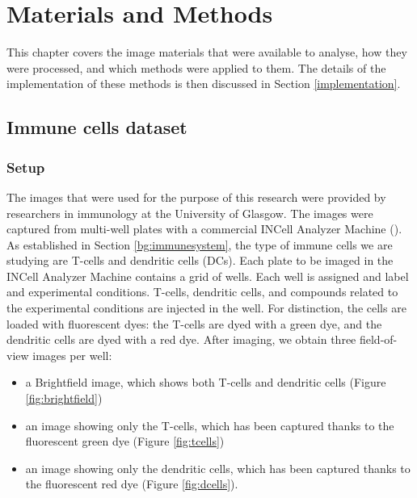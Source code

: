 \documentclass{l4proj}
\begin{document}
\chapter{Materials and Methods} \label{sec:mm}

This chapter covers the image materials that were available to analyse, how they were processed, and which methods were applied to them. The details of the implementation of these methods is then discussed in Section \ref{implementation}.

\section{Immune cells dataset}

\subsection{Setup}

The images that were used for the purpose of this research were provided by researchers in immunology at the University of Glasgow. The images were captured from multi-well plates with a commercial INCell Analyzer Machine (\cite{https://www.gelifesciences.com/en/us/shop/cell-imaging-and-analysis/high-content-analysis-systems/instruments/in-cell-analyzer-2500-hs-high-content-analysis-hca-imaging-system-p-04586}). As established in Section \ref{bg:immunesystem}, the type of immune cells we are studying are T-cells and dendritic cells (DCs). Each plate to be imaged in the INCell Analyzer Machine contains a grid of wells. Each well is assigned and label and experimental conditions. T-cells, dendritic cells, and compounds related to the experimental conditions are injected in the well. For distinction, the cells are loaded with fluorescent dyes: the T-cells are dyed with a green dye, and the dendritic cells are dyed with a red dye. After imaging, we obtain three field-of-view images per well:

\begin{itemize}
    \item a Brightfield image, which shows both T-cells and dendritic cells (Figure \ref{fig:brightfield})
    \item an image showing only the T-cells, which has been captured thanks to the fluorescent green dye (Figure \ref{fig:tcells})
    \item an image showing only the dendritic cells, which has been captured thanks to the fluorescent red dye (Figure \ref{fig:dcells}).
\end{itemize}
\end{document}
